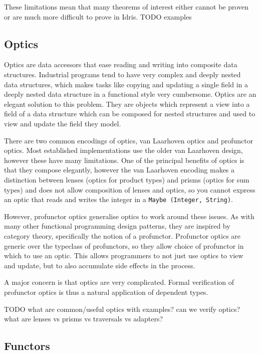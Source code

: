\documentclass[]{report}
\begin{document}
These limitations mean that many theorems of interest either cannot be proven or are much more difficult to prove in Idris. TODO examples

\subsection{Optics}

Optics are data accessors that ease reading and writing into composite data structures. Industrial programs tend to have very complex and deeply nested data structures, which makes tasks like copying and updating a single field in a deeply nested data structure in a functional style very cumbersome. Optics are an elegant solution to this problem. They are objects which represent a view into a field of a data structure which can be composed for nested structures and used to view and update the field they model.

There are two common encodings of optics, van Laarhoven optics and profunctor optics. Most established implementations use the older van Laarhoven design, however these have many limitations. One of the principal benefits of optics is that they compose elegantly, however the van Laarhoven encoding makes a distinction between lenses (optics for product types) and prisms (optics for sum types) and does not allow composition of lenses and optics, so you cannot express an optic that reads and writes the integer in a \texttt{Maybe (Integer, String)}.

However, profunctor optics generalise optics to work around these issues. As with many other functional programming design patterns, they are inspired by category theory, specifically the notion of a profunctor. Profunctor optics are generic over the typeclass of profunctors, so they allow choice of profunctor in which to use an optic. This allows programmers to not just use optics to view and update, but to also accumulate side effects in the process.

A major concern is that optics are very complicated. Formal verification of profunctor optics is thus a natural application of dependent types.

TODO
what are common/useful optics with examples?
can we verify optics?
what are lenses vs prisms vs traversals vs adapters?

\subsection{Functors}
\end{document}
